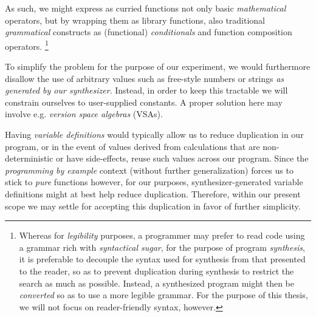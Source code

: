 \documentclass{article}
\begin{document}

As such, we might express as curried functions not only basic \emph{mathematical} operators,
but by wrapping them as library functions,
also traditional \emph{grammatical} constructs as (functional) \emph{conditionals} and function composition operators.%
\footnote{
    Whereas for \emph{legibility} purposes, a programmer may prefer to read code using a grammar rich with \emph{syntactical sugar},
    for the purpose of program \emph{synthesis},
    it is preferable to decouple the syntax used for synthesis from that presented to the reader,
    so as to prevent duplication during synthesis to restrict the search as much as possible.
    Instead, a synthesized program might then be \emph{converted} so as to use a more legible grammar.
    For the purpose of this thesis, we will not focus on reader-friendly syntax, however.
}


To simplify the problem for the purpose of our experiment,
we would furthermore disallow the use of arbitrary values such as free-style numbers or strings \emph{as generated by our synthesizer}.%
Instead, in order to keep this tractable we will constrain ourselves to user-supplied constants.
A proper solution here may involve e.g. \emph{version space algebras} (VSAs).~\citep{mitchell1982generalization}


Having \emph{variable definitions} would typically allow us to reduce duplication in our program,
or in the event of values derived from calculations that are non-deterministic or have side-effects,
reuse such values across our program.
Since the \emph{programming by example} context (without further generalization) forces us to stick to \emph{pure} functions however,
for our purposes, synthesizer-generated variable definitions might at best help reduce duplication.
Therefore, within our present scope we may settle for accepting this duplication in favor of further simplicity.

\end{document}
